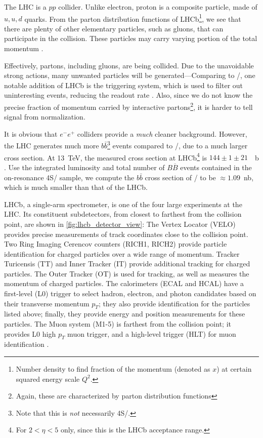 The LHC is a $pp$ collider.
Unlike electron, proton is a composite particle, made of $u, u, d$ quarks.
From the parton distribution functions of LHCb\footnote{
    Number density to find fraction of the momentum (denoted as $x$) at certain
    squared energy scale $Q^2$.
}, we see that there are plenty of other elementary particles, such as gluons,
that can participate in the collision.
These particles may carry varying portion of the total
momentum \cite{Ball:2014uwa}.

Effectively, partons, including gluons, are being collided.
Due to the unavoidable strong actions, many unwanted particles will be
generated---Comparing to \BaBar/, one notable addition of LHCb is the triggering
system, which is used to filter out uninteresting events, reducing the readout
rate \cite{LHCb:2008}.
Also, since we do not know the precise fraction of momentum carried by
interactive partons\footnote{
Again, these are characterized by parton distribution functions}, it is harder
to tell signal from normalization.

It is obvious that $e^- e^+$ colliders provide a \emph{much} cleaner background.
However, the LHC generates much more $b\bar{b}$\footnote{
    Note that this is \emph{not} necessarily \Y4S/.
} events compared to \BaBar/, due to a much larger cross section.
At \SI{13}{TeV}, the measured cross section at LHCb\footnote{
    For $2 < \eta < 5$ only, since this is the LHCb acceptance range.
} is $144 \pm 1 \pm 21$~\si{\mu b} \cite{Aaij:2016avz}.
Use the integrated luminosity and total number of $B\overline{B}$ events
contained in the on-resonance \Y4S/ sample, we compute the $b\bar{b}$ cross
section of \BaBar/ to be $\approx 1.09$~\si{nb}, which is much smaller than that
of the LHCb.

LHCb, a single-arm spectrometer, is one of the four large experiments at the
LHC.
Its constituent subdetectors, from closest to farthest from the collision point,
are shown in \autoref{fig:lhcb_detector_view}:
The Vertex Locator (VELO) provides precise measurements of track coordinates
close to the collision point.
Two Ring Imaging Cerencov counters (RICH1, RICH2) provide particle
identification for charged particles over a wide range of momentum.
Tracker Turicensis (TT) and Inner Tracker (IT) provide additional tracking for
charged particles.
The Outer Tracker (OT) is used for tracking, as well as measures the momentum
of charged particles.
The calorimeters (ECAL and HCAL) have a first-level (L0) trigger to select
hadron, electron, and photon candidates based on their transverse momentum
$p_T$;
they also provide identification for the particles listed above;
finally, they provide energy and position measurements for these particles.
The Muon system (M1-5) is farthest from the collision point;
it provides L0 high $p_T$ muon trigger, and a high-level trigger (HLT) for muon
identification \cite{LHCb:2008}.

